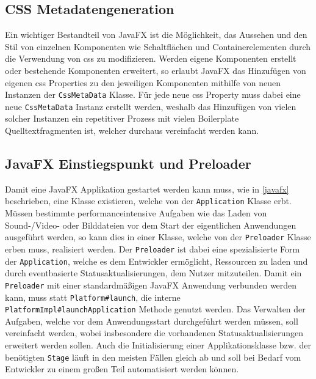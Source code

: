 \subsection{CSS Metadatengeneration}
Ein wichtiger Bestandteil von JavaFX ist die Möglichkeit, das Aussehen und den Stil von einzelnen Komponenten wie Schaltflächen und Containerelementen durch die Verwendung von \ac{css} zu modifizieren. Werden eigene Komponenten erstellt oder bestehende Komponenten erweitert, so erlaubt JavaFX das Hinzufügen von eigenen \ac{css} Properties zu den jeweiligen Komponenten mithilfe von neuen Instanzen der \texttt{CssMetaData} Klasse. Für jede neue \ac{css} Property muss dabei eine neue \texttt{CssMetaData} Instanz erstellt werden, weshalb das Hinzufügen von vielen solcher Instanzen ein repetitiver Prozess mit vielen Boilerplate Quelltextfragmenten ist, welcher durchaus vereinfacht werden kann.
\subsection{JavaFX Einstiegspunkt und Preloader}
Damit eine JavaFX Applikation gestartet werden kann muss, wie in \autoref{javafx} beschrieben, 
eine Klasse existieren, welche von der \texttt{Application} Klasse erbt. Müssen bestimmte performanceintensive Aufgaben wie das Laden von Sound-/Video- oder Bilddateien vor dem Start der eigentlichen Anwendungen ausgeführt werden, so kann dies in einer Klasse, welche von der \texttt{Preloader} Klasse erben muss, realisiert werden. Der \texttt{Preloader} ist dabei eine spezialisierte Form der \texttt{Application}, welche es dem Entwickler ermöglicht, Ressourcen zu laden und durch eventbasierte Statusaktualisierungen, dem Nutzer mitzuteilen. Damit ein \texttt{Preloader} mit einer standardmäßigen JavaFX Anwendung verbunden werden kann, muss statt \texttt{Platform\#launch}, die interne \texttt{PlatformImpl\#launchApplication} Methode genutzt werden. Das Verwalten der Aufgaben, welche vor dem Anwendungsstart durchgeführt werden müssen, soll vereinfacht werden, wobei insbesondere die vorhandenen Statusaktualisierungen  erweitert werden sollen. Auch die Initialisierung einer Applikationsklasse bzw. der benötigten \texttt{Stage} läuft in den meisten Fällen gleich ab und soll bei Bedarf vom Entwickler zu einem großen Teil automatisiert werden können.
